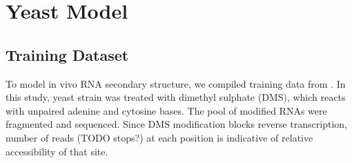 \documentclass{proposal}
\begin{document}
%
%
%
%
%
%
%
%
%
%
%
%
%
%





%
%
%
%
%
%
%




%
%

\chapter{Yeast Model}

\section{Training Dataset}

To model in vivo RNA secondary structure, we compiled training data from \cite{rouskin2014genome}.
In this study, yeast strain was treated with ﻿dimethyl sulphate (DMS), which reacts with ﻿unpaired adenine and cytosine bases.
The pool of modified RNAs were fragmented and sequenced.
Since ﻿DMS modification blocks reverse transcription, ﻿
number of reads (TODO stops?) at each position is indicative of relative accessibility of that site.
\end{document}
